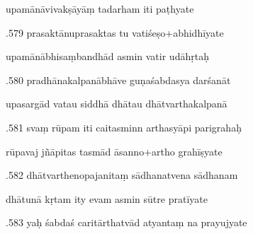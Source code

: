\documentclass[article,12pt,a4paper]{memoir}%
\newcounter{parCount}
\begin{document}
	  
	  \pstart \leavevmode%
	upamānāvivakṣāyāṃ tadarham iti paṭhyate 
	{}
	\pend%
      

	  
	  \pstart {}.579 prasaktānuprasaktas tu vatiśeṣo+abhidhīyate 
	{}
	\pend%
      

	  
	  \pstart \leavevmode%
	upamānābhisaṃbandhād asmin vatir udāhṛtaḥ 
	{}
	\pend%
      

	  
	  \pstart {}.580 pradhānakalpanābhāve guṇaśabdasya darśanāt 
	{}
	\pend%
      

	  
	  \pstart \leavevmode%
	upasargād vatau siddhā dhātau dhātvarthakalpanā 
	{}
	\pend%
      

	  
	  \pstart {}.581 svaṃ rūpam iti caitasminn arthasyāpi parigrahaḥ 
	{}
	\pend%
      

	  
	  \pstart \leavevmode%
	rūpavaj jñāpitas tasmād āsanno+artho grahīṣyate 
	{}
	\pend%
      

	  
	  \pstart {}.582 dhātvarthenopajanitaṃ sādhanatvena sādhanam 
	{}
	\pend%
      

	  
	  \pstart \leavevmode%
	dhātunā kṛtam ity evam asmin sūtre pratīyate 
	{}
	\pend%
      

	  
	  \pstart {}.583 yaḥ śabdaś caritārthatvād atyantaṃ na prayujyate 
	{}
	\pend%
      
\end{document}
